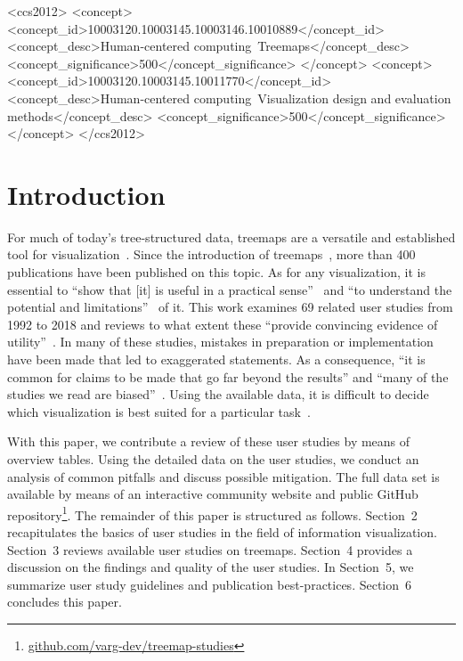 \documentclass[sigconf,
natbib=true]{acmart}
\begin{document}
\begin{CCSXML}
    <ccs2012>
    <concept>
    <concept_id>10003120.10003145.10003146.10010889</concept_id>
    <concept_desc>Human-centered computing~Treemaps</concept_desc>
    <concept_significance>500</concept_significance>
    </concept>
    <concept>
    <concept_id>10003120.10003145.10011770</concept_id>
    <concept_desc>Human-centered computing~Visualization design and evaluation methods</concept_desc>
    <concept_significance>500</concept_significance>
    </concept>
    </ccs2012>
\end{CCSXML}



\maketitle

\section{Introduction}
\label{sec:introduction}
For much of today's tree-structured data, treemaps are a versatile and established tool for visualization~\cite{mcnabb2017-surveyofsurveys}.
Since the introduction of treemaps~\cite{johnson1991-spacefilling}, more than 400 publications have been published on this topic.
As for any visualization, it is essential to \enquote{show that [it] is useful in a practical sense}~\cite{kosara2003-userstudies} and \enquote{to understand the potential and limitations}~\cite{plaisant2004-evaluation} of it.
This work examines 69 related user studies from 1992 to 2018 and reviews to what extent these \enquote{provide convincing evidence of utility}~\cite{plaisant2004-evaluation}.
In many of these studies, mistakes in preparation or implementation have been made that led to exaggerated statements. 
As a consequence, \enquote{it is common for claims to be made that go far beyond the results} and \enquote{many of the studies we read are biased}~\cite{ware2013-infovis}.
Using the available data, it is difficult to decide which visualization is best suited for a particular task~\cite{lam2012-empirical}.

With this paper, we contribute a review of these user studies by means of overview tables.
Using the detailed data on the user studies, we conduct an analysis of common pitfalls and discuss possible mitigation.
The full data set is available by means of an interactive community website and public GitHub repository\footnote{\href{https://github.com/varg-dev/treemap-studies}{github.com/varg-dev/treemap-studies}}.
The remainder of this paper is structured as follows.
Section~2 recapitulates the basics of user studies in the field of information visualization.
Section~3 reviews available user studies on treemaps.
Section~4 provides a discussion on the findings and quality of the user studies.
In Section~5, we summarize user study guidelines and publication best-practices.
Section~6 concludes this paper.
\end{document}
